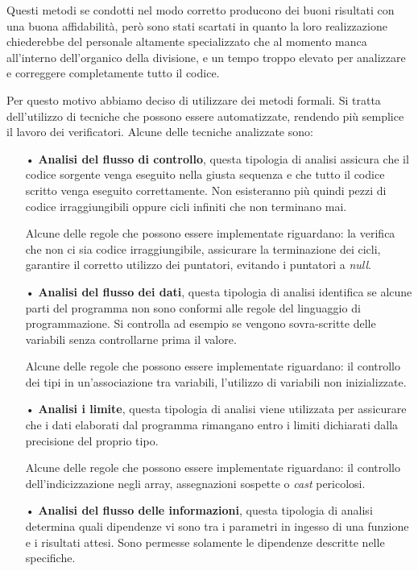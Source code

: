 Questi metodi se condotti nel modo corretto producono dei buoni risultati con una buona affidabilità, però sono stati scartati in quanto la loro realizzazione chiederebbe del personale altamente specializzato che al momento manca all'interno dell'organico della divisione, e un tempo troppo elevato per analizzare e correggere completamente tutto il codice.

Per questo motivo abbiamo deciso di utilizzare dei metodi formali. Si tratta dell'utilizzo di tecniche che possono essere automatizzate, rendendo più semplice il lavoro dei verificatori. Alcune delle tecniche analizzate sono:
\begin{itemize}
\item[•] \textbf{Analisi del flusso di controllo}, questa tipologia di analisi assicura che il codice sorgente venga eseguito nella giusta sequenza e che tutto il codice scritto venga eseguito correttamente. Non esisteranno più quindi pezzi di codice irraggiungibili oppure cicli infiniti che non terminano mai.

Alcune delle regole che possono essere implementate riguardano: la verifica che non ci sia codice irraggiungibile, assicurare la terminazione dei cicli, garantire il corretto utilizzo dei puntatori, evitando i puntatori a \textit{null}.

\item[•] \textbf{Analisi del flusso dei dati}, questa tipologia di analisi identifica se alcune parti del programma non sono conformi alle regole del linguaggio di programmazione. Si controlla ad esempio se vengono sovra-scritte delle variabili senza controllarne prima il valore.

Alcune delle regole che possono essere implementate riguardano: il controllo dei tipi in un'associazione tra variabili, l'utilizzo di variabili non inizializzate.

\item[•] \textbf{Analisi i limite}, questa tipologia di analisi viene utilizzata per assicurare che i dati elaborati dal programma rimangano entro i limiti dichiarati dalla precisione del proprio tipo.

Alcune delle regole che possono essere implementate riguardano: il controllo dell'indicizzazione negli array, assegnazioni sospette o \textit{cast} pericolosi.

\item[•] \textbf{Analisi del flusso delle informazioni}, questa tipologia di analisi determina quali dipendenze vi sono tra i parametri in ingesso di una funzione e i risultati attesi. Sono permesse solamente le dipendenze descritte nelle specifiche.

\end{itemize}

